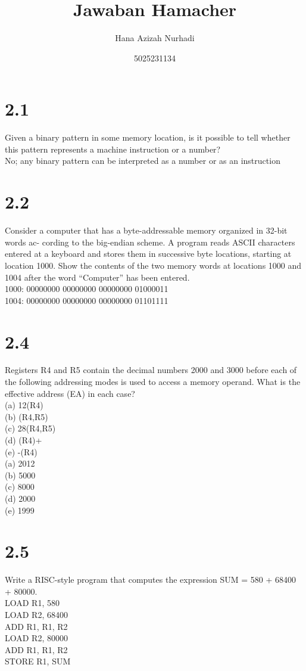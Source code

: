 \documentclass{article}
\title{Jawaban Hamacher}
\author{Hana Azizah Nurhadi}
\date{5025231134}
\begin{document}
\maketitle

\section{2.1}
Given a binary pattern in some memory location, is it possible to tell whether this pattern represents a machine instruction or a number?
\vspace{0.5cm}
\\ No; any binary pattern can be interpreted as a number or as an instruction

\section{2.2}
Consider a computer that has a byte-addressable memory organized in 32-bit words ac- cording to the big-endian scheme. A program reads ASCII characters entered at a keyboard and stores them in successive byte locations, starting at location 1000. Show the contents of the two memory words at locations 1000 and 1004 after the word “Computer” has been entered.
\vspace{0.5cm}
\\ 1000: 00000000 00000000 00000000 01000011
\\ 1004: 00000000 00000000 00000000 01101111

\section{2.4}
Registers R4 and R5 contain the decimal numbers 2000 and 3000 before each of the following addressing modes is used to access a memory operand. What is the effective address (EA) in each case?
\\ (a) 12(R4)
\\ (b) (R4,R5)
\\ (c) 28(R4,R5)
\\ (d) (R4)+
\\ (e) -(R4)
\vspace{0.5cm}
\\ (a) 2012
\\ (b) 5000
\\ (c) 8000
\\ (d) 2000
\\ (e) 1999

\section{2.5}
Write a RISC-style program that computes the expression SUM = 580 + 68400 + 80000.
\vspace{0.5cm}
\\ LOAD R1, 580
\\ LOAD R2, 68400
\\ ADD R1, R1, R2
\\ LOAD R2, 80000
\\ ADD R1, R1, R2
\\ STORE R1, SUM
\end{document}
